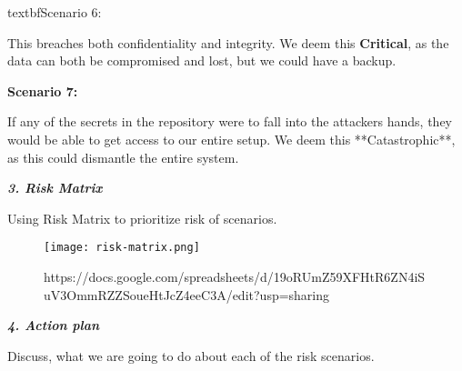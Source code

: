 textbf{Scenario 6:}

This breaches both confidentiality and integrity. We deem this \textbf{Critical}, as the data can both be compromised and lost, but we could have a backup.

\textbf{Scenario 7:}

If any of the secrets in the repository were to fall into the attackers hands, they would be able to get access to our entire setup. We deem this **Catastrophic**, as this could dismantle the entire system.

\textit{\textbf{3. Risk Matrix}}

Using Risk Matrix to prioritize risk of scenarios.



\begin{figure}[H]
    \begin{center}
        \texttt{[image: risk-matrix.png]}
    \end{center}
    \caption{https://docs.google.com/spreadsheets/d/19oRUmZ59XFHtR6ZN4iSuV3OmmRZZSoueHtJcZ4eeC3A/edit?usp=sharing}
    \label{fig:risk-matrix}
\end{figure}

\textit{\textbf{4. Action plan}}

Discuss, what we are going to do about each of the risk scenarios.
